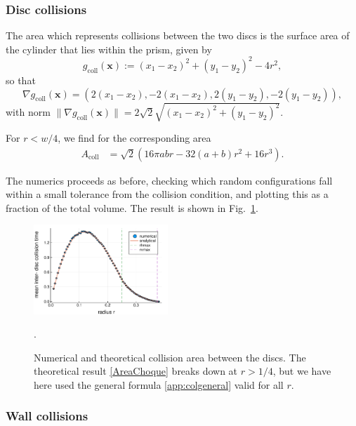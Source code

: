 \documentclass[superscriptaddress,pre,reprint,showpacs,twocolumn]{revtex4-1}
\begin{document}
\subsubsection{Disc collisions}

The area which represents collisions between the two discs is the surface area of the cylinder
that lies within the prism, given by
$$g_\text{coll}(\mathbf{x}) := (x_1 - x_2)^2 + (y_1 - y_2)^2 - 4r^2, $$
so that
$$\nabla g_\text{coll}(\mathbf{x}) = (2 (x_1 - x_2), -2(x_1 - x_2), 2(y_1 - y_2), -2(y_1 - y_2)),$$ 
with norm $\| \nabla g_\text{coll}(\mathbf{x}) \| = 2\sqrt{2} \sqrt{(x_1 - x_2)^2 + (y_1 - y_2)^2}$.


For $r<w/4$, we find for the corresponding area
\begin{align}\label{AreaChoque}
A_\text{coll} & =  \sqrt{2} (
16\pi a b r -32 (a+b)r^2 +16 r^3).
\end{align}

The numerics proceeds as before, checking which
random configurations
fall within a small tolerance from the collision condition, and
plotting this as a fraction of the total volume. The result is shown in Fig.~\ref{AreaChoqueTeoyNum}. 
\begin{figure}
\centering
\includegraphics[width=0.45\textwidth]{./figures/AreaCol01.pdf}
\caption{Numerical and theoretical collision area 
between the discs.  The theoretical result
\eqref{AreaChoque} breaks down at
$r > 1/4$, but we have here used the general formula  \eqref{app:colgeneral} valid for all $r$.}
\label{AreaChoqueTeoyNum}.
\end{figure}


\subsubsection{Wall collisions}
\end{document}
